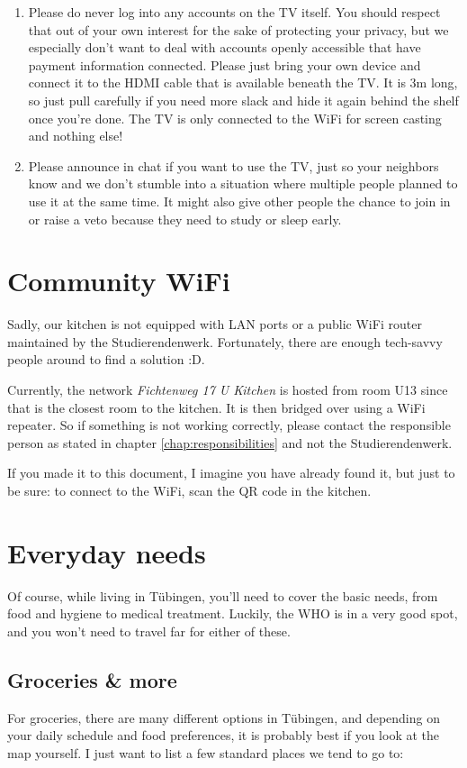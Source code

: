 \begin{enumerate}
      \item Please do never log into any accounts on the TV itself. You should respect that out of your own interest for the sake of protecting your privacy, but we especially don’t want to deal with accounts openly accessible that have payment information connected. Please just bring your own device and connect it to the HDMI cable that is available beneath the TV. It is 3m long, so just pull carefully if you need more slack and hide it again behind the shelf once you're done. The TV is only connected to the WiFi for screen casting and nothing else!

      \item Please announce in chat if you want to use the TV, just so your neighbors know and we don’t stumble into a situation where multiple people planned to use it at the same time. It might also give other people the chance to join in or raise a veto because they need to study or sleep early.
\end{enumerate}

\section{Community WiFi} \label{sec:wifi}
Sadly, our kitchen is not equipped with LAN ports or a public WiFi router maintained by the Studierendenwerk. Fortunately, there are enough tech-savvy people around to find a solution :D.

Currently, the network \textit{Fichtenweg 17 U Kitchen} is hosted from room U13 since that is the closest room to the kitchen. It is then bridged over using a WiFi repeater. So if something is not working correctly, please contact the responsible person as stated in chapter \ref{chap:responsibilities} and not the Studierendenwerk.

If you made it to this document, I imagine you have already found it, but just to be sure: to connect to the WiFi, scan the QR code in the kitchen.

\section{Everyday needs}
Of course, while living in Tübingen, you'll need to cover the basic needs, from food and hygiene to medical treatment. Luckily, the WHO is in a very good spot, and you won't need to travel far for either of these.

\subsection{Groceries \& more}
For groceries, there are many different options in Tübingen, and depending on your daily schedule and food preferences, it is probably best if you look at the map yourself. I just want to list a few standard places we tend to go to:

